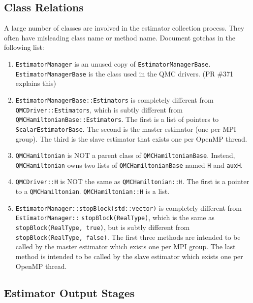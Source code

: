 \subsection{Class Relations}
A large number of classes are involved in the estimator collection process. They often have misleading class name or method name. Document gotchas in the following list:
\begin{enumerate}
\item \verb|EstimatorManager| is an unused copy of \verb|EstimatorManagerBase|. \verb|EstimatorManagerBase| is the class used in the QMC drivers. (PR \#371 explains this)
\item \verb|EstimatorManagerBase::Estimators| is completely different from \verb|QMCDriver::Estimators|, which is subtly different from \verb|QMCHamiltonianBase::Estimators|. The first is a list of pointers to \verb|ScalarEstimatorBase|. The second is the master estimator (one per MPI group). The third is the slave estimator that exists one per OpenMP thread.
\item \verb|QMCHamiltonian| is NOT a parent class of \verb|QMCHamiltonianBase|. Instead, \verb|QMCHamiltonian| owns two lists of \verb|QMCHamiltonianBase| named \verb|H| and \verb|auxH|.
\item \verb|QMCDriver::H| is NOT the same as \verb|QMCHamiltonian::H|. The first is a pointer to a \verb|QMCHamiltonian|. \verb|QMCHamiltonian::H| is a list.
\item \verb|EstimatorManager::stopBlock(std::vector)| is completely different from \verb|EstimatorManager::|
\verb|stopBlock(RealType)|, which is the same as \verb|stopBlock(RealType, true)|, but is subtly different from \verb|stopBlock(RealType, false)|. The first three methods are intended to be called by the master estimator which exists one per MPI group. The last method is intended to be called by the slave estimator which exists one per OpenMP thread.
\end{enumerate}

\subsection{Estimator Output Stages}


